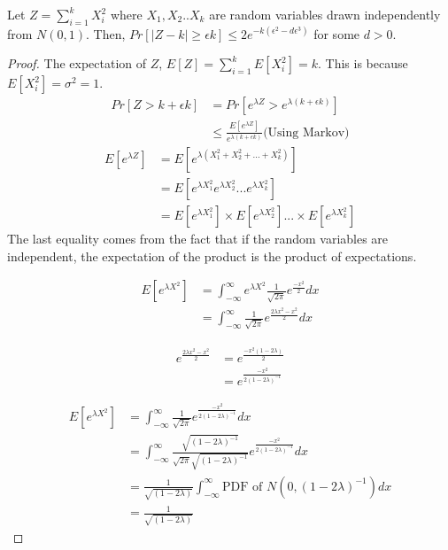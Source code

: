\documentclass[11pt]{article}
\begin{document}
\begin{theorem}
Let $Z=\sum_{i=1}^{k} X_i^2$ where $X_1, X_2..X_k$ are random variables drawn independently from $N(0,1)$. Then, $Pr[|Z-k|\geq \epsilon k] \leq 2 e^{-k(\epsilon^2 - d\epsilon^3)}$ for some $d>0$.
\end{theorem}
\begin{proof}
The expectation of $Z$, $E[Z] = \sum_{i=1}^{k} E[X_i^2] = k$. This is because $E[X_i^2] = \sigma^2 = 1$.
\begin{equation}
\begin{split}
Pr[Z> k + \epsilon k] &= Pr[e^{\lambda Z}> e^{\lambda(k+\epsilon k)}] \\
&\leq \frac{E[e^{\lambda Z}]}{e^{\lambda(k+\epsilon k)}} \text{(Using Markov)}
\end{split}
\end{equation}
\begin{equation}
\begin{split}
E[e^{\lambda Z}] &= E[e^{\lambda(X_1^2 + X_2^2 + ... + X_k^2)}] \\
&= E[e^{\lambda X_1^2}e^{\lambda X_2^2}...e^{\lambda X_k^2}]\\
&= E[e^{\lambda X_1^2}] \times E[e^{\lambda X_2^2}] ... \times E[e^{\lambda X_k^2}]
\end{split}
\end{equation}
The last equality comes from the fact that if the random variables are independent, the expectation of the product is the product of expectations.

\begin{equation}
\begin{split}
E[e^{\lambda X^2}] &= \int_{-\infty}^{\infty} e^{\lambda X^2} \frac{1}{\sqrt{2\pi}} e^{\frac{-x^2}{2}} dx \\
&= \int_{-\infty}^{\infty} \frac{1}{\sqrt{2\pi}} e^{\frac{2\lambda x^2-x^2}{2}} dx
\end{split}
\end{equation}

\begin{equation}
\begin{split}
e^{\frac{2\lambda x^2-x^2}{2}} &= e^{\frac{-x^2(1-2\lambda)}{2}} \\
&= e^{\frac{-x^2}{2(1-2\lambda)^{-1}}}
\end{split}
\end{equation}

\begin{equation}
\begin{split}
E[e^{\lambda X^2}] &= \int_{-\infty}^{\infty} \frac{1}{\sqrt{2\pi}} e^{\frac{-x^2}{2(1-2\lambda)^{-1}}} dx \\
&= \int_{-\infty}^{\infty} \frac{\sqrt{(1-2\lambda)^{-1}}}{\sqrt{2\pi}\sqrt{(1-2\lambda)^{-1}}} e^{\frac{-x^2}{2(1-2\lambda)^{-1}}} dx \\
&= \frac{1}{\sqrt{(1-2\lambda)}} \int_{-\infty}^{\infty} \text{PDF of } N(0,(1-2\lambda)^{-1}) dx\\
&= \frac{1}{\sqrt{(1-2\lambda)}}
\end{split}
\end{equation}


\end{proof}
\end{document}
